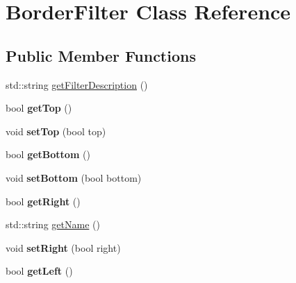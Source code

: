 \hypertarget{classPlayer_1_1BorderFilter}{}\section{Border\+Filter Class Reference}
\label{classPlayer_1_1BorderFilter}
\subsection*{Public Member Functions}
\begin{DoxyCompactItemize}
\item 
std\+::string \hyperlink{classPlayer_1_1BorderFilter_a2b3f7d8fcd3d774b4a2fde5914a9729f}{get\+Filter\+Description} ()
\item 
\hypertarget{classPlayer_1_1BorderFilter_a7f662ce666098754b0916a828633f842}{}bool {\bfseries get\+Top} ()\label{classPlayer_1_1BorderFilter_a7f662ce666098754b0916a828633f842}

\item 
\hypertarget{classPlayer_1_1BorderFilter_a41a3d0253d877ec681fc30f85ae21aed}{}void {\bfseries set\+Top} (bool top)\label{classPlayer_1_1BorderFilter_a41a3d0253d877ec681fc30f85ae21aed}

\item 
\hypertarget{classPlayer_1_1BorderFilter_ac96fcca335b0daaa5e216993666a7af2}{}bool {\bfseries get\+Bottom} ()\label{classPlayer_1_1BorderFilter_ac96fcca335b0daaa5e216993666a7af2}

\item 
\hypertarget{classPlayer_1_1BorderFilter_ae60a4cf24fcd4cc34ca831917a609e79}{}void {\bfseries set\+Bottom} (bool bottom)\label{classPlayer_1_1BorderFilter_ae60a4cf24fcd4cc34ca831917a609e79}

\item 
\hypertarget{classPlayer_1_1BorderFilter_a09836b29d544b94e145dd6a725887dd2}{}bool {\bfseries get\+Right} ()\label{classPlayer_1_1BorderFilter_a09836b29d544b94e145dd6a725887dd2}

\item 
std\+::string \hyperlink{classPlayer_1_1BorderFilter_ac0fc966d4386ddb71d99361e3fccb311}{get\+Name} ()
\item 
\hypertarget{classPlayer_1_1BorderFilter_a18165f5951ddba8f3b25b2a199f90bc1}{}void {\bfseries set\+Right} (bool right)\label{classPlayer_1_1BorderFilter_a18165f5951ddba8f3b25b2a199f90bc1}

\item 
\hypertarget{classPlayer_1_1BorderFilter_afb561071d09e3b031b1d951c51e94f24}{}bool {\bfseries get\+Left} ()\label{classPlayer_1_1BorderFilter_afb561071d09e3b031b1d951c51e94f24}


\end{DoxyCompactItemize}
